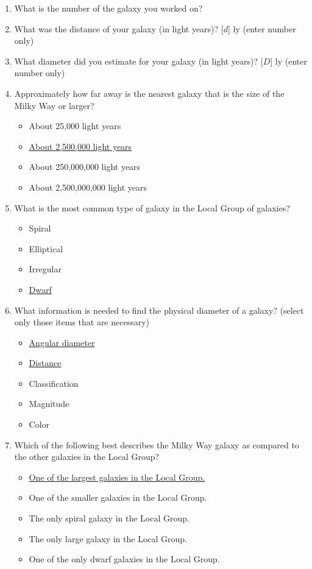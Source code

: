 \documentclass[12pt]{article}
\begin{document}
\begin{enumerate}
\item
What is the number of the galaxy you worked on?
\item
What was the distance of your galaxy (in light years)? [$d$] ly (enter number only)
\item
What diameter did you estimate for your galaxy (in light years)? [$D$] ly (enter number only)
\item
Approximately how far away is the nearest galaxy that is the size of the Milky Way or larger?
\begin{itemize}
    \item About 25,000 light years
    \item \underline{About 2,500,000 light years}
    \item About 250,000,000 light years
    \item About 2,500,000,000 light years
\end{itemize}
\item
What is the most common type of galaxy in the Local Group of galaxies?
\begin{itemize}
    \item Spiral
    \item Elliptical
    \item Irregular
    \item \underline{Dwarf}
\end{itemize}
\item
What information is needed to find the physical diameter of a galaxy? (select only those items that are necessary)
\begin{itemize}
    \item \underline{Angular diameter}
    \item \underline{Distance}
    \item Classification
    \item Magnitude
    \item Color
\end{itemize}
\item
Which of the following best describes the Milky Way galaxy as compared to the other galaxies in the Local Group?
\begin{itemize}
    \item \underline{One of the largest galaxies in the Local Group.}
    \item One of the smaller galaxies in the Local Group.
    \item The only spiral galaxy in the Local Group.
    \item The only large galaxy in the Local Group.
    \item One of the only dwarf galaxies in the Local Group.
\end{itemize}
\end{enumerate}
\end{document}
